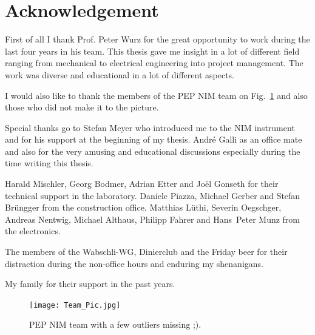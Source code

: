 \documentclass[a4paper, 12pt, abstracton]{scrartcl}
\begin{document}

	
	\newpage
	\thispagestyle{empty}
	\null
	\newpage
	
	\newpage
	
	\clearpage
	\newpage
	\thispagestyle{empty}
	\null
	\newpage
	
	\clearpage
	
	\clearpage
	
	\clearpage
	
	\newpage
	\thispagestyle{empty}
	\null
	\newpage
	
	\section*{Acknowledgement}
	
	
	First of all I thank Prof. Peter Wurz for the great opportunity to work during the last four years in his team. This thesis gave me insight in a lot of different field ranging from mechanical to electrical engineering into project management. The work was diverse and educational in a lot of different aspects.
	
	I would also like to thank the members of the PEP NIM team on Fig.~\ref{fig:TeamPic} and also those who did not make it to the picture.
	
	Special thanks go to Stefan Meyer who introduced me to the NIM instrument and for his support at the beginning of my thesis. André Galli as an office mate and also for the very amusing and educational discussions especially during the time writing this thesis.
	
	Harald Mischler, Georg Bodmer, Adrian Etter and Joël Gonseth for their technical support in the laboratory. Daniele Piazza, Michael Gerber and Stefan Brüngger from the construction office. Matthias Lüthi, Severin Oegschger, Andreas Nentwig, Michael Althaus, Philipp Fahrer and Hans~Peter Munz from the electronics.
	
	The members of the Wabschli-WG, Dinierclub and the Friday beer for their distraction during the non-office hours and enduring my shenanigans.
	
	My family for their support in the past years.
	
	\begin{figure}[h]
		\centering
		\texttt{[image: Team\_Pic.jpg]}
		\caption{PEP NIM team with a few outliers missing ;).}
		\label{fig:TeamPic}
	\end{figure}
	
	\newpage
	\thispagestyle{empty}
	\null
	\newpage
	
	
	\newpage
	\thispagestyle{empty}
	\null
	\newpage
	
	
	\newpage
	\thispagestyle{empty}
	\null
	\newpage
	
	
\end{document}
